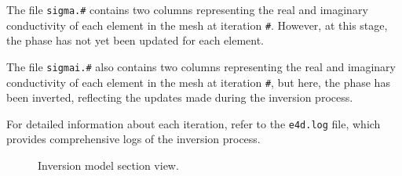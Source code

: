 \documentclass[a4paper,12pt]{article}
\begin{document}
The file \texttt{sigma.\#} contains two columns representing the real and imaginary conductivity of each element in the mesh at iteration \texttt{\#}. However, at this stage, the phase has not yet been updated for each element.

The file \texttt{sigmai.\#} also contains two columns representing the real and imaginary conductivity of each element in the mesh at iteration \texttt{\#}, but here, the phase has been inverted, reflecting the updates made during the inversion process.

For detailed information about each iteration, refer to the \texttt{e4d.log} file, which provides comprehensive logs of the inversion process.

\begin{figure}[H]
\centering
{}
\caption{Inversion model section view.}
\label{fig:inversion}
\end{figure}









\end{document}
